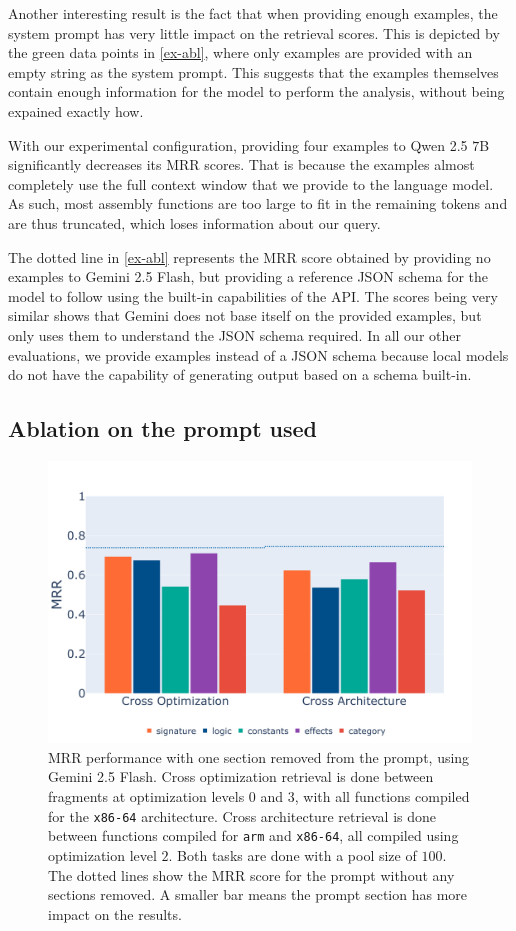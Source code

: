 Another interesting result is the fact that when providing enough examples, the system prompt has very little impact on the retrieval scores.
This is depicted by the green data points in \autoref{ex-abl}, where only examples are provided with an empty string as the system prompt.
This suggests that the examples themselves contain enough information for the model to perform the analysis, without being expained 
exactly how.

With our experimental configuration, providing four examples to Qwen 2.5 \(7\)B significantly decreases its MRR scores. That is because
the examples almost completely use the full context window that we provide to the language model. As such, most assembly functions are
too large to fit in the remaining tokens and are thus truncated, which loses information about our query.

The dotted line in \autoref{ex-abl} represents the MRR score obtained by providing no examples to Gemini 2.5 Flash, but providing a reference JSON
schema for the model to follow using the built-in capabilities of the API. The scores being very similar shows that Gemini does not base itself on the
provided examples, but only uses them to understand the JSON schema required. In all our other evaluations, we provide examples instead of a JSON
schema because local models do not have the capability of generating output based on a schema built-in.

\subsection{Ablation on the prompt used}

\begin{figure}
\centerline{\includegraphics[width=\linewidth]{prompt-ablation}}
\caption{
MRR performance with one section removed from the prompt, using Gemini 2.5 Flash. Cross optimization retrieval is done between fragments at
optimization levels \(0\) and \(3\), with all functions compiled for the \texttt{x86-64} architecture. Cross architecture retrieval is done between functions
compiled for \texttt{arm} and \texttt{x86-64}, all compiled using optimization level \(2\). Both tasks are done with a pool size of \(100\). The dotted lines
show the MRR score for the prompt without any sections removed. A smaller bar means the prompt section has more impact on the results.}
\label{prompt-abl}
\end{figure}

